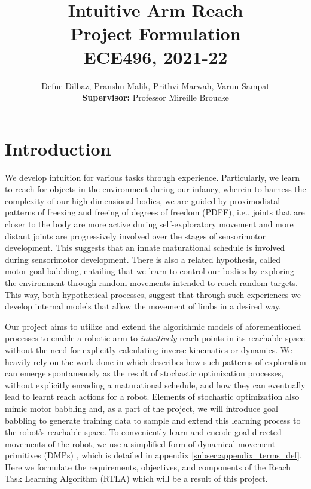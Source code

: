 \documentclass[10pt]{article}
\date{}
\begin{document}
\title{\vspace{-1cm}\textbf{\Large{Intuitive Arm Reach}} \\ \Large{Project Formulation} \\ \textbf{\small{ECE496, 2021-22}}\\\vspace{-0.3cm}}
\author{Defne Dilbaz, Pranshu Malik, Prithvi Marwah, Varun Sampat \\\small{\textbf{Supervisor:}} Professor Mireille Broucke \vspace{-3cm}}

\maketitle

\section{Introduction}
We develop intuition for various tasks through experience. Particularly, we learn to reach for objects in the environment during our infancy, wherein to harness the complexity of our high-dimensional bodies, we are guided by proximodistal patterns of freezing and freeing of degrees of freedom (PDFF), i.e., joints that are closer to the body are more active during self-exploratory movement and more distant joints are progressively involved over the stages of sensorimotor development. This suggests that an innate maturational schedule is involved during sensorimotor development. There is also a related hypothesis, called motor-goal babbling, entailing that we learn to control our bodies by exploring the environment through random movements intended to reach random targets. This way, both hypothetical processes, suggest that through such experiences we develop internal models that allow the movement of limbs in a desired way.

Our project aims to utilize and extend the algorithmic models of aforementioned processes to enable a robotic arm to \emph{intuitively} reach points in its reachable space without the need for explicitly calculating inverse kinematics or dynamics. We heavily rely on the work done in \cite{pdff} which describes how such patterns of exploration can emerge spontaneously as the result of stochastic optimization processes, without explicitly encoding a maturational schedule, and how they can eventually lead to learnt reach actions for a robot. Elements of stochastic optimization also mimic motor babbling and, as a part of the project, we will introduce goal babbling to generate training data to sample and extend this learning process to the robot's reachable space. To conveniently learn and encode goal-directed movements of the robot, we use a simplified form of dynamical movement primitives (DMPs) \cite{dmps}, which is detailed in appendix \ref{subsec:appendix_terms_def}. Here we formulate the requirements, objectives, and components of the Reach Task Learning Algorithm (RTLA) which will be a result of this project.
\end{document}
